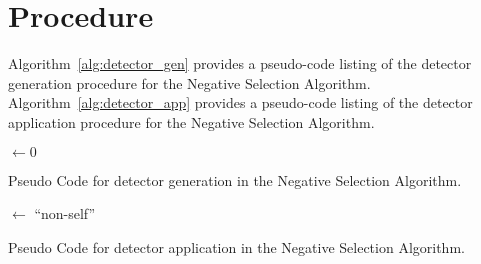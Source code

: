 \documentclass[a4paper, 11pt]{article}
\begin{document}
\section{Procedure}
\label{sec:procedure}
Algorithm~\ref{alg:detector_gen} provides a pseudo-code listing of the detector generation procedure for the Negative Selection Algorithm. Algorithm~\ref{alg:detector_app} provides a pseudo-code listing of the detector application procedure for the Negative Selection Algorithm.

\begin{algorithm}[ht]
	\SetLine  
  \KwIn{\SelfData}
  \KwOut{\Repertoire}
	\Repertoire $\leftarrow 0$\;
  \While{$\neg$\StopCondition{}}{
		\Detectors $\leftarrow$ \GenerateRandomDetectors{}\;
		\ForEach{\CurrentDetector $\in$ \Repertoire}{
			\If{$\neg$\Matches{\CurrentDetector, \SelfData}}{
				\Repertoire $\leftarrow$ \CurrentDetector\;
			}
		}
	}
	\Return{\Repertoire}\;	
	\caption{Pseudo Code for detector generation in the Negative Selection Algorithm.}
	\label{alg:detector_gen}
\end{algorithm}

\begin{algorithm}[ht]
	\SetLine  
  \KwIn{\InputSamples, \Repertoire}
  \For{\CurrentInputSample $\in$ \InputSamples}
 	{
		\InputSampleClassification $\leftarrow$ ``non-self''\;
	}	
	\caption{Pseudo Code for detector application in the Negative Selection Algorithm.}
	\label{alg:detector_app}
\end{algorithm}
 
\end{document}
